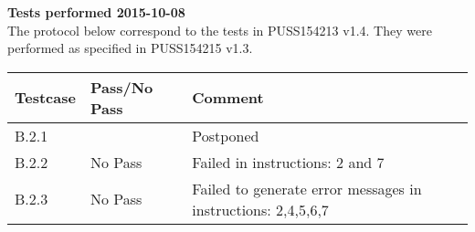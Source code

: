\renewcommand{\testdate}{2015-10-08}
\textbf{Tests performed \testdate} \\
The protocol below correspond to the tests in PUSS154213 v1.4. They were performed as specified in PUSS154215 v1.3.
\begin{center}
  		\begin{tabular}{| p{3cm} | p{5cm} | p{5cm} |}
    		\hline
	    	\textbf{Testcase}			& \textbf{Pass/No Pass} 	& \textbf{Comment} \\ \hline
    		B.2.1		 						&  												& Postponed 				\\ \hline
    		B.2.2		 						& No Pass 										& Failed in instructions: 2 and 7				 \\	\hline
    		B.2.3		 						& No Pass 										& Failed to generate error messages in instructions: 2,4,5,6,7 				 \\	\hline
 		\end{tabular}
\end{center}